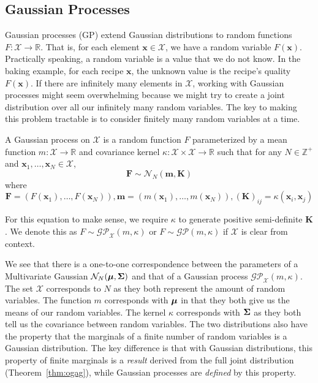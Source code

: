 \subsection{Gaussian Processes}\label{ssec:gp}

Gaussian processes (GP) extend Gaussian distributions to random functions $F: \mathcal{X} \to \mathbb{R}$.
That is, for each element $\mathbf{x} \in \mathcal{X}$, we have a random variable $F(\mathbf{x})$.
Practically speaking, a random variable is a value that we do not know.
In the baking example, for each recipe $\mathbf{x}$, the unknown value is the recipe's quality $F(\mathbf{x})$.
If there are infinitely many elements in $\mathcal{X}$, working with Gaussian processes might seem overwhelming because we might try to create a joint distribution over all our infinitely many random variables.
The key to making this problem tractable is to consider finitely many random variables at a time.

\begin{definition}\label{def:gp}
    A Gaussian process on $\mathcal{X}$ is a random function $F$ parameterized by a mean function
    $m: \mathcal{X} \to \mathbb{R}$ and covariance kernel $\kappa: \mathcal{X} \times \mathcal{X} \to \mathbb{R}$
    such that for any $N \in \mathbb{Z}^{+}$ and $\mathbf{x}_1, \dots,\mathbf{x}_N \in \mathcal{X}$,
    \begin{equation*}
        \mathbf{F} \sim \mathcal{N}_N\left(\mathbf{m}, \mathbf{K}\right)
    \end{equation*}
    where
    \begin{equation*}
        \mathbf{F} = (F(\mathbf{x}_1), \dots, F(\mathbf{x}_N)), \mathbf{m} = (m(\mathbf{x}_1), \dots, m(\mathbf{x}_N)), (\mathbf{K})_{ij} = \kappa(\mathbf{x}_i, \mathbf{x}_j)
    \end{equation*}

    For this equation to make sense, we require $\kappa$ to generate positive semi-definite $\mathbf{K}$.
    We denote this as $F \sim \mathcal{GP}_{\mathcal{X}}(m, \kappa)$ or $F \sim \mathcal{GP}(m, \kappa)$ if $\mathcal{X}$ is clear from context.
\end{definition}

We see that there is a one-to-one correspondence between the parameters of a Multivariate Gaussian $\mathcal{N}_{N}(\boldsymbol{\mu}, \boldsymbol{\Sigma})$ and that of a Gaussian process $\mathcal{GP}_{ \mathcal{X}}(m, \kappa)$.
The set $\mathcal{X}$ corresponds to $N$ as they both represent the amount of random variables.
The function $m$ corresponds with $\boldsymbol{\mu}$ in that they both give us the means of our random variables.
The kernel $\kappa$ corresponds with $\boldsymbol{\Sigma}$ as they both tell us the covariance between random variables.
The two distributions also have the property that the marginals of a finite number of random variables is a Gaussian distribution.
The key difference is that with Gaussian distributions, this property of finite marginals is a \emph{result} derived from the full joint distribution (Theorem~\ref{thm:ogag}), while Gaussian processes are \emph{defined} by this property.

